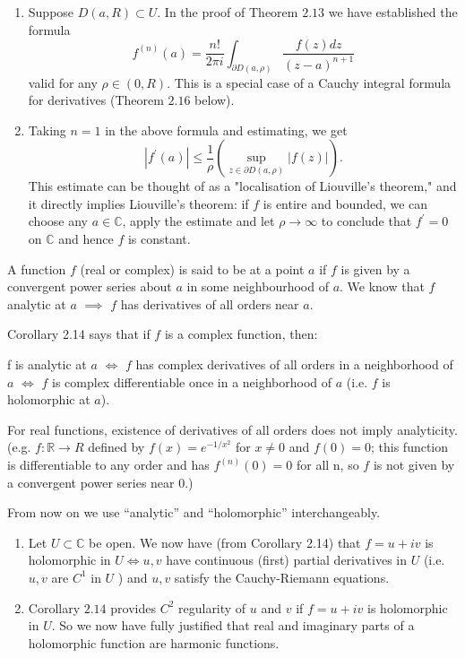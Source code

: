 \documentclass[egregdoesnotlikesansseriftitles,a4paper]{scrartcl}
\begin{document}
\begin{remarks}
      \begin{enumerate}
           \item Suppose $D(a, R) \subset U$. In the proof of Theorem $2.13$ we have established the formula
           $$
           f^{(n)}(a)=\frac{n !}{2 \pi i} \int_{\partial D(a, \rho)} \frac{f(z) d z}{(z-a)^{n+1}}
           $$
           valid for any $\rho \in(0, R)$. This is a special case of a Cauchy integral formula for derivatives (Theorem $2.16$ below).
           \item Taking $n=1$ in the above formula and estimating, we get \[
               \left|f^{\prime}(a)\right| \leq \frac{1}{\rho}\left(\sup _{z \in \partial D(a, \rho)}|f(z)|\right)
           .\]  This estimate can be thought of as a "localisation of Liouville's theorem," and it directly implies Liouville's theorem: if $f$ is entire and bounded, we can choose any $a \in \mathbb{C}$, apply the estimate and let $\rho \rightarrow \infty$ to conclude that $f^{\prime}=0$ on $\mathbb{C}$ and hence $f$ is constant.
      \end{enumerate}
\end{remarks}

A function $f$ (real or complex) is said to be  at a point $a$ if $f$ is given by a convergent power series about $a$ in some neighbourhood of $a$. We know that $f$ analytic at $a$ $\implies $ $f$ has derivatives of all orders near $a$.

Corollary 2.14 says that if $f$ is a complex function, then:

f is analytic at $a$ $\iff$ $f$ has complex derivatives of all orders in a
neighborhood of $a$ $\iff$ $f$ is complex differentiable once in a
neighborhood of $a$ (i.e. $f$ is holomorphic at $a$).

For real functions, existence of derivatives of all orders does not imply analyticity.
(e.g. $f: \mathbb{R}\rightarrow R$ defined by $f (x)=e^{-1/x^2}$ for $x \neq 0$ and $f (0)=0$; this function is differentiable to any order and has $f^{(n)}(0)=0$ for all n, so $f$ is not given by a convergent power series near 0.)
\begin{notation}
     From now on we use “analytic” and “holomorphic” interchangeably.
\end{notation}
\begin{remarks}
      \begin{enumerate}
          \item Let $U \subset \mathbb{C}$ be open. We now have (from Corollary 2.14) that $f=u+i v$ is holomorphic in $U \Longleftrightarrow u, v$ have continuous (first) partial derivatives in $U$ (i.e. $u, v$ are $C^{1}$ in $U$ ) and $u, v$ satisfy the Cauchy-Riemann equations.
          \item Corollary $2.14$ provides $C^{2}$ regularity of $u$ and $v$ if $f=u+i v$ is holomorphic in $U$. So we now have fully justified that real and imaginary parts of a holomorphic function are harmonic functions.
      \end{enumerate}
      
\end{remarks}
\end{document}
